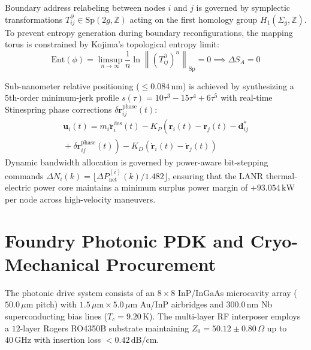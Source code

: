 \documentclass[twocolumn,aps,pra,floatfix,superscriptaddress,10pt]{revtex4-2}
\begin{document}
Boundary address relabeling between nodes $i$ and $j$ is governed by symplectic transformations $T^\partial_{ij} \in \text{Sp}(2g, \mathbb{Z})$ acting on the first homology group $H_1(\Sigma_g, \mathbb{Z})$. To prevent entropy generation during boundary reconfigurations, the mapping torus is constrained by Kojima's topological entropy limit:
\begin{equation}
\text{Ent}(\phi) = \limsup_{n \to \infty} \frac{1}{n} \ln \left\| (T^\partial_{ij})^n \right\|_{\text{Sp}} = 0 \implies \Delta S_A = 0
\label{eq:kojima_entropy}
\end{equation}

Sub-nanometer relative positioning ($\le 0.084\,\text{nm}$) is achieved by synthesizing a $5\text{th}$-order minimum-jerk profile $s(\tau) = 10\tau^3 - 15\tau^4 + 6\tau^5$ with real-time Stinespring phase corrections $\delta \mathbf{r}_{ij}^{\text{phase}}(t)$:
\begin{multline}
\mathbf{u}_i(t) = m_i \ddot{\mathbf{r}}_i^{\text{des}}(t) - K_P \left( \mathbf{r}_i(t) - \mathbf{r}_j(t) - \mathbf{d}_{ij}^* \right. \\ {} + \left. \delta \mathbf{r}_{ij}^{\text{phase}}(t) \right) - K_D \left( \dot{\mathbf{r}}_i(t) - \dot{\mathbf{r}}_j(t) \right)
\label{eq:sub_nano_gnc}
\end{multline}
Dynamic bandwidth allocation is governed by power-aware bit-stepping commands $\Delta N_i(k) = \lfloor \Delta P_{\text{net}}^{(i)}(k) / 1.482 \rfloor$, ensuring that the LANR thermal-electric power core maintains a minimum surplus power margin of $+93.054\,\text{kW}$ per node across high-velocity maneuvers.

\section{Foundry Photonic PDK and Cryo-Mechanical Procurement}
\label{sec:foundry_mechanical}

The photonic drive system consists of an $8 \times 8$ InP/InGaAs microcavity array ($50.0\,\mu\text{m}$ pitch) with $1.5\,\mu\text{m} \times 5.0\,\mu\text{m}$ Au/InP airbridges and $300.0\,\text{nm}$ Nb superconducting bias lines ($T_c = 9.20\,\text{K}$). The multi-layer RF interposer employs a $12$-layer Rogers RO4350B substrate maintaining $Z_0 = 50.12 \pm 0.80\,\Omega$ up to $40\,\text{GHz}$ with insertion loss $< 0.42\,\text{dB/cm}$.
\end{document}
